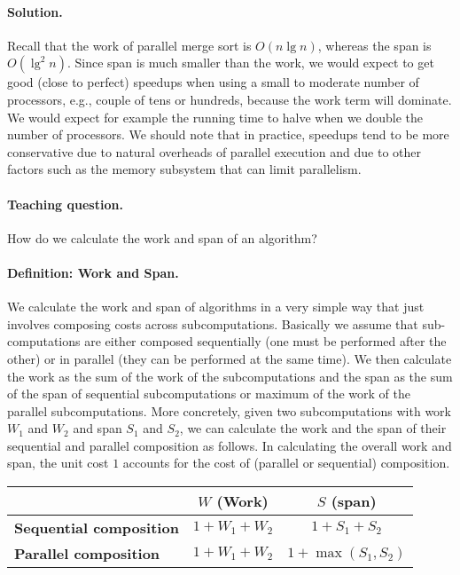 \paragraph{Solution.}
Recall that the work of parallel merge sort is $O(n\lg{n})$, whereas
the span is $O(\lg^2{n})$.  
%
Since span is much smaller than the work, we would expect to get good
(close to perfect) speedups when using a small to moderate number of
processors, e.g., couple of tens or hundreds, because the work term
will dominate.
%
We would expect for example the running time to halve when we double
the number of processors.
%
We should note that in practice, speedups tend to be more conservative
due to natural overheads of parallel execution and due to other
factors such as the memory subsystem that can limit parallelism.

\paragraph{Teaching question.}
How do we calculate the work and span of an algorithm?


\paragraph{Definition: Work and Span.}
We calculate the work and span of algorithms in a very
simple way that just involves composing costs across subcomputations.
%
Basically we assume that sub-computations are either composed
sequentially (one must be performed after the other) or in parallel
(they can be performed at the same time).
%
We then calculate the work as the sum of the work of the
subcomputations and the span as the sum of the span of sequential
subcomputations or maximum of the work of the parallel
subcomputations.
%
More concretely, given two subcomputations with work $W_1$ and $W_2$
and span $S_1$ and $S_2$, we can calculate the work and the span of
their sequential and parallel composition as follows.
%
In calculating the overall work and span, the unit cost $1$ accounts
for the cost of (parallel or sequential) composition.


\begin{center}
\renewcommand{\arraystretch}{1.5}
\begin{tabular}{lcc}
\toprule
                          &  \bf $W$ (Work) & \bf $S$ (span)\\
\midrule
\bf Sequential composition & $1 + W_1 + W_2$ & $1 + S_1+ S_2$\\
\midrule
\bf Parallel composition   & $1 + W_1 + W_2$ & $1 + \max(S_1, S_2)$\\
\bottomrule
\end{tabular}
\end{center}

